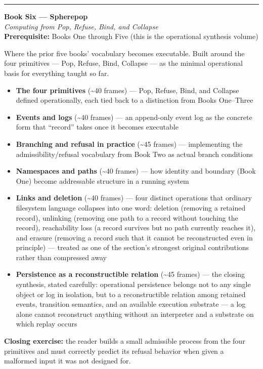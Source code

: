 \documentclass[11pt]{article}
\newenvironment{bookentry}[3]{%
  \par\noindent\rule{\linewidth}{0.5pt}\par\vspace{0.5em}
  {\Large\bfseries #1}\\[0.15em]
  {\itshape\large #2}\\[0.3em]
  {\small\textbf{Prerequisite:} #3}\par\vspace{0.6em}
}{\par\vspace{0.8em}}
\newenvironment{sectionlist}{%
  \begin{itemize}[leftmargin=1.4em, itemsep=0.45em, topsep=0.3em]
}{%
  \end{itemize}
}
\newcommand{\secitem}[3]{\item \textbf{#1} (\textasciitilde#2 frames) --- #3}
\begin{document}
\begin{bookentry}{Book Six --- Spherepop}{Computing from Pop, Refuse, Bind, and Collapse}{Books One through Five (this is the operational synthesis volume)}
Where the prior five books' vocabulary becomes executable. Built around the four primitives --- Pop, Refuse, Bind, Collapse --- as the minimal operational basis for everything taught so far.

\begin{sectionlist}
\secitem{The four primitives}{40}{Pop, Refuse, Bind, and Collapse defined operationally, each tied back to a distinction from Books One--Three}
\secitem{Events and logs}{40}{an append-only event log as the concrete form that ``record'' takes once it becomes executable}
\secitem{Branching and refusal in practice}{45}{implementing the admissibility/refusal vocabulary from Book Two as actual branch conditions}
\secitem{Namespaces and paths}{40}{how identity and boundary (Book One) become addressable structure in a running system}
\secitem{Links and deletion}{40}{four distinct operations that ordinary filesystem language collapses into one word: deletion (removing a retained record), unlinking (removing one path to a record without touching the record), reachability loss (a record survives but no path currently reaches it), and erasure (removing a record such that it cannot be reconstructed even in principle) --- treated as one of the section's strongest original contributions rather than compressed away}
\secitem{Persistence as a reconstructible relation}{45}{the closing synthesis, stated carefully: operational persistence belongs not to any single object or log in isolation, but to a reconstructible relation among retained events, transition semantics, and an available execution substrate --- a log alone cannot reconstruct anything without an interpreter and a substrate on which replay occurs}
\end{sectionlist}
\textbf{Closing exercise:} the reader builds a small admissible process from the four primitives and must correctly predict its refusal behavior when given a malformed input it was not designed for.
\end{bookentry}
\end{document}
